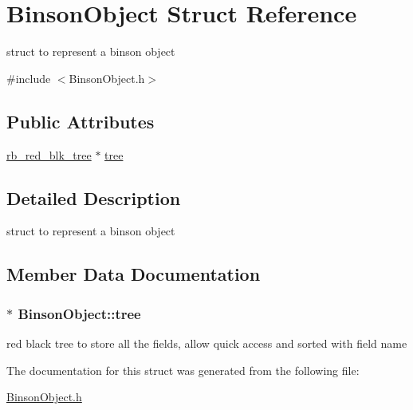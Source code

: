 \hypertarget{structBinsonObject}{\section{Binson\-Object Struct Reference}
\label{structBinsonObject}
}


struct to represent a binson object  




{\ttfamily \#include $<$Binson\-Object.\-h$>$}

\subsection*{Public Attributes}
\begin{DoxyCompactItemize}
\item 
\hyperlink{structrb__red__blk__tree}{rb\-\_\-red\-\_\-blk\-\_\-tree} $\ast$ \hyperlink{structBinsonObject_a083ba69fcdc8f2e7a84e8a80a71ab111}{tree}
\end{DoxyCompactItemize}


\subsection{Detailed Description}
struct to represent a binson object 

\subsection{Member Data Documentation}
\hypertarget{structBinsonObject_a083ba69fcdc8f2e7a84e8a80a71ab111}{
\subsubsection[{tree}]{$\ast$ Binson\-Object\-::tree}}\label{structBinsonObject_a083ba69fcdc8f2e7a84e8a80a71ab111}
red black tree to store all the fields, allow quick access and sorted with field name 

The documentation for this struct was generated from the following file\-:\begin{DoxyCompactItemize}
\item 
\hyperlink{BinsonObject_8h}{Binson\-Object.\-h}\end{DoxyCompactItemize}

